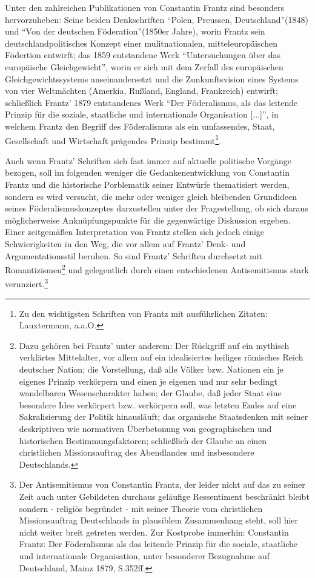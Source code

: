 \documentclass[a4paper,12pt]{article}
\begin{document}
Unter den zahlreichen Publikationen von Constantin Frantz sind
besonders hervorzuheben: Seine beiden Denkschriften "`Polen,
Preussen, Deutschland"'(1848) und "`Von der deutschen
Föderation"'(1850er Jahre), worin Frantz sein
deutschlandpolitisches Konzept einer mulitnationalen,
mitteleuropäischen Födertion entwirft; das 1859 entstandene Werk
"`Untersuchungen über das europäische Gleichgewicht"', worin er
sich mit dem Zerfall des europäischen Gleichgewichtssystems
auseinandersetzt und die Zunkunftsvision eines Systems von vier
Weltmächten (Amerkia, Rußland, England, Frankreich) entwirft;
schließlich Frantz' 1879 entstandenes Werk "`Der Föderalismus, als
das leitende Prinzip für die soziale, staatliche und internationale
Organisation [...]"', in welchem Frantz den Begriff des
Föderalismus als ein umfassendes, Staat, Gesellschaft und
Wirtschaft prägendes Prinzip bestimmt\footnote{Zu den wichtigsten Schriften von Frantz mit ausführlichen Zitaten: Lauxtermann\cite{lauxtermann}, a.a.O. }.

Auch wenn Frantz' Schriften sich fast immer auf aktuelle politische
Vorgänge bezogen, soll im folgenden weniger die Gedankenentwicklung
von Constantin Frantz und die historische Porblematik seiner
Entwürfe thematisiert werden, sondern es wird versucht, die mehr
oder weniger gleich bleibenden Grundideen seines
Föderalismuskonzeptes darzustellen unter der Fragestellung, ob sich
daraus möglicherweise Anknüpfungspunkte für die gegenwärtige
Diskussion ergeben. Einer zeitgemäßen Interpretation von Frantz
stellen sich jedoch einige Schwierigkeiten in den Weg, die vor
allem auf Frantz' Denk- und Argumentationsstil beruhen. So sind
Frantz' Schriften durchsetzt mit Romantizismen\footnote{Dazu
gehören bei Frantz' unter anderem: Der Rückgriff auf ein mythisch
verklärtes Mittelalter, vor allem auf ein idealisiertes heiliges
römisches Reich deutscher Nation; die Vorstellung, daß alle Völker
bzw. Nationen ein je eigenes Prinzip verkörpern und einen je
eigenen und nur sehr bedingt wandelbaren Wesenscharakter haben; der
Glaube, daß jeder Staat eine besondere Idee verkörpert
bzw. verkörpern soll, was letzten Endes auf eine Sakralisierung der
Politik hinausläuft; das organische Staatsdenken mit seiner
deskriptiven wie normativen Überbetonung von geographischen und
historischen Bestimmungsfaktoren; schließlich der Glaube an einen
christlichen Missionsauftrag des Abendlandes und insbesondere
Deutschlands.} und gelegentlich durch einen entschiedenen
Antisemitismus stark verunziert.\footnote{Der Antisemitismus von
Constantin Frantz, der leider nicht auf das zu seiner Zeit auch
unter Gebildeten durchaus geläufige Ressentiment beschränkt bleibt
sondern - religiös begründet - mit seiner Theorie vom christlichen
Missionsauftrag Deutschlands in plausiblem Zusammenhang steht, soll
hier nicht weiter breit getreten werden. Zur Kostprobe immerhin:
Constantin Frantz\cite{frantz-foederalismus}: Der Föderalismus als
das leitende Prinzip für die sociale, staatliche und internationale
Organisation, unter besonderer Bezugnahme auf Deutschland, Mainz
1879, S.352ff.}
\end{document}
